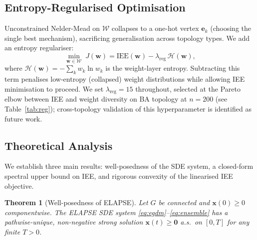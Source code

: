 \documentclass[review,12pt]{elsarticle}
\newcommand{\bfx}{\mathbf{x}}
\newcommand{\bfw}{\mathbf{w}}
\newcommand{\IEE}{\mathrm{IEE}}
\newtheorem{theorem}{Theorem}
\begin{document}
\subsection{Entropy-Regularised Optimisation}

Unconstrained Nelder-Mead on $\mathcal{W}$ collapses to a one-hot vertex
$\mathbf{e}_k$ (choosing the single best mechanism), sacrificing
generalisation across topology types. We add an entropy regulariser:
\begin{equation}
  \min_{\bfw \in \mathcal{W}}\; J(\bfw)
    = \IEE(\bfw) - \lambda_{\mathrm{reg}}\,\mathcal{H}(\bfw),
  \label{eq:objective}
\end{equation}
where $\mathcal{H}(\bfw) = -\sum_k w_k \ln w_k$ is the weight-layer
entropy. Subtracting this term penalises low-entropy (collapsed) weight
distributions while allowing IEE minimisation to proceed. We set
$\lambda_{\mathrm{reg}} = 15$ throughout, selected at the Pareto elbow
between IEE and weight diversity on BA topology at $n=200$
(see Table~\ref{tab:reg}); cross-topology validation of this hyperparameter
is identified as future work.

\subsection{Theoretical Analysis}
\label{sec:theory}

We establish three main results: well-posedness of the SDE system, a
closed-form spectral upper bound on IEE, and rigorous convexity of the
linearised IEE objective.

\begin{theorem}[Well-posedness of ELAPSE]
\label{thm:wellposed}
Let $G$ be connected and $\bfx(0) \geq 0$ componentwise.
The ELAPSE SDE system \eqref{eq:egdm}--\eqref{eq:ensemble} has a
pathwise-unique, non-negative strong solution $\bfx(t) \geq \mathbf{0}$
a.s.\ on $[0,T]$ for any finite $T > 0$.
\end{theorem}
\end{document}
